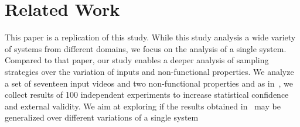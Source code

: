 \section{Related Work} \label{sec:related_work}

This paper is a replication of this study.
While this study analysis a wide variety of systems from different domains, we focus on the analysis of a single system.
Compared to that paper, our study enables a deeper analysis of sampling strategies over the variation of inputs and non-functional properties. 
We analyze a set of seventeen input videos and two non-functional properties and as in~\cite{kaltenecker2019}, we collect results of 100 independent experiments to increase statistical confidence and external validity.
We aim at exploring if the results obtained in~\cite{kaltenecker2019} may be generalized over different variations of a single system
